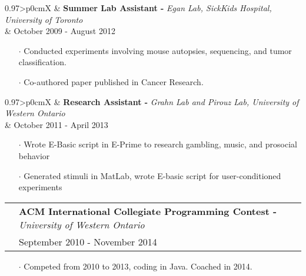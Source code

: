 \documentclass[a4paper, oneside, final]{scrartcl} %
\newcommand{\gray}{\rowcolor[gray]{.90}} %
\begin{document}
\begin{center}
\vspace{-0.05cm}

\begin{tabularx}{0.97\linewidth}{>{\raggedleft\scshape}p{0cm}X}
\gray & \textbf{Summer Lab Assistant -} \textit{Egan Lab, SickKids Hospital, University of Toronto}\\
\gray & {October 2009 - August 2012}\\
\end{tabularx}
\vspace{-0.1cm}
\begin{itemize} \itemsep-0.2cm
\item[$\cdot$] Conducted experiments involving mouse autopsies, sequencing, and tumor classification.
\item[$\cdot$] Co-authored paper published in Cancer Research.\\
\end{itemize}

\vspace{-0.05cm}

\begin{tabularx}{0.97\linewidth}{>{\raggedleft\scshape}p{0cm}X}
\gray & \textbf{Research Assistant -} \textit{Grahn Lab and Pirouz Lab, University of Western Ontario}\\
\gray & {October 2011 - April 2013}\\
\end{tabularx}
\vspace{-0.1cm}
\begin{itemize} \itemsep-0.2cm
\item[$\cdot$] Wrote E-Basic script in E-Prime to research gambling, music, and prosocial behavior\\
\item[$\cdot$] Generated stimuli in MatLab, wrote E-basic script for user-conditioned experiments\\
\end{itemize}

\vspace{-0.05cm}

\begin{tabularx}{0.97\linewidth}{>{\raggedleft\scshape}p{0cm}X}
\gray & \textbf{ACM International Collegiate Programming Contest -} \textit{University of Western Ontario}\\
\gray & {September 2010 - November 2014}\	\
\end{tabularx}
\vspace{-0.1cm}
\begin{itemize} \itemsep-0.2cm
\item[$\cdot$] Competed from 2010 to 2013, coding in Java. Coached in 2014.\\

\end{itemize}


\end{center}
\end{document}
